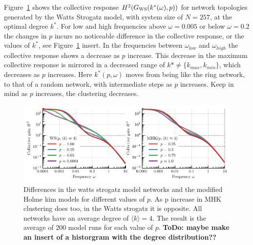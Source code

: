 \documentclass[fleqn,10pt]{wlscirep}
\newcommand{\TODO}[1]{{\bf {\color{red} ToDo:} #1}}
\begin{document}
Figure~\ref{fig:wscmp} shows the collective response $H^2(G_{\textsc{WS}}(k^*(\omega),p))$ for network topologies generated by the Watts Strogatz model, with system size of $N = 257$, at the optimal degree $k^*$. For low and high frequencies above $\omega = 0.005$ or below $\omega = 0.2$ the changes in $p$ incurs no noticeable difference in the collective response, or the values of $k^*$, see Figure~\ref{fig:wscmp} insert. In the frequencies between $\omega_{low}$ and $\omega_{high} $ the collective response shows a decrease as $p$ increase. This decrease in the maximum collective response is mirrored in a decreased range of $k* \neq\{k_{max}, k_{min}\}$, which decreases as $p$ increases. Here $k^*(p,\omega)$ moves from being like the ring network, to that of a random network, with intermediate steps as $p$ increases. Keep in mind as $p$ increases, the clustering decreases.

\begin{figure}[hbtp]
  \includegraphics[width=0.997\textwidth]{fig/ws_mhk_response.pdf}
\caption{Differences in the watts strogatz model networks and the modified Holme kim models for different values of $p$. As p increase in MHK clustering does too, in the Watts strogatz it is opposite. All networks have an average degree of $\langle k\rangle =4$. The result is the average of $200$ model runs for each value of $p$. \TODO{maybe make an insert of a historgram with the degree distribution??}}
\label{fig:wscmp}
\end{figure}


\end{document}
